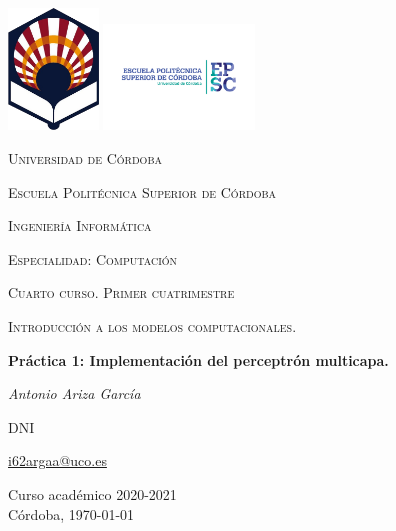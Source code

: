 \begin{titlepage}
\centering
\includegraphics[width=0.18\textwidth]{img/logo_uco_sin_texto.png}
\includegraphics[width=0.30\textwidth]{img/logo_uco_epsc.png}\par\vspace{1cm}
{\scshape\LARGE Universidad de Córdoba\par}
{\scshape\Large Escuela Politécnica Superior de Córdoba\par}
\vspace{1cm}
{\scshape\LARGE Ingeniería Informática\par}
{\scshape\Large Especialidad: Computación\par}
{\scshape\Large Cuarto curso. Primer cuatrimestre\par}
\vspace{1.5cm}
{\scshape\LARGE Introducción a los modelos computacionales.\par}
\vspace{1.5cm}
{\huge\bfseries Práctica 1: Implementación del perceptrón multicapa.\par}
\vspace{1.2cm}
{\Large\itshape Antonio Ariza García\par}
DNI\par
\href{mailto:correo@uco.es}{i62argaa@uco.es}\par
\vfill

{\large Curso académico 2020-2021\\Córdoba, \today\par}
\end{titlepage}
